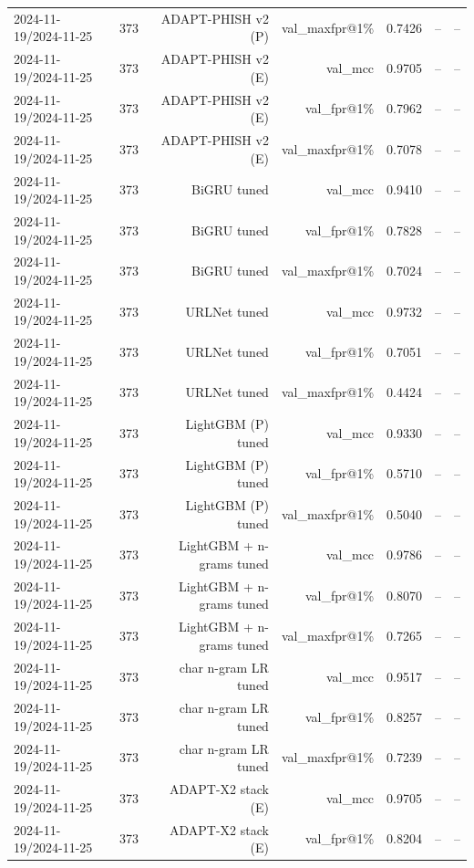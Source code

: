 \begin{table}[t]
\begin{tabular}{llrrrrr}
2024-11-19/2024-11-25 & 373 & ADAPT-PHISH v2 (P) & val\_maxfpr@1\% & 0.7426 & -- & -- \\
2024-11-19/2024-11-25 & 373 & ADAPT-PHISH v2 (E) & val\_mcc & 0.9705 & -- & -- \\
2024-11-19/2024-11-25 & 373 & ADAPT-PHISH v2 (E) & val\_fpr@1\% & 0.7962 & -- & -- \\
2024-11-19/2024-11-25 & 373 & ADAPT-PHISH v2 (E) & val\_maxfpr@1\% & 0.7078 & -- & -- \\
2024-11-19/2024-11-25 & 373 & BiGRU tuned & val\_mcc & 0.9410 & -- & -- \\
2024-11-19/2024-11-25 & 373 & BiGRU tuned & val\_fpr@1\% & 0.7828 & -- & -- \\
2024-11-19/2024-11-25 & 373 & BiGRU tuned & val\_maxfpr@1\% & 0.7024 & -- & -- \\
2024-11-19/2024-11-25 & 373 & URLNet tuned & val\_mcc & 0.9732 & -- & -- \\
2024-11-19/2024-11-25 & 373 & URLNet tuned & val\_fpr@1\% & 0.7051 & -- & -- \\
2024-11-19/2024-11-25 & 373 & URLNet tuned & val\_maxfpr@1\% & 0.4424 & -- & -- \\
2024-11-19/2024-11-25 & 373 & LightGBM (P) tuned & val\_mcc & 0.9330 & -- & -- \\
2024-11-19/2024-11-25 & 373 & LightGBM (P) tuned & val\_fpr@1\% & 0.5710 & -- & -- \\
2024-11-19/2024-11-25 & 373 & LightGBM (P) tuned & val\_maxfpr@1\% & 0.5040 & -- & -- \\
2024-11-19/2024-11-25 & 373 & LightGBM + n-grams tuned & val\_mcc & 0.9786 & -- & -- \\
2024-11-19/2024-11-25 & 373 & LightGBM + n-grams tuned & val\_fpr@1\% & 0.8070 & -- & -- \\
2024-11-19/2024-11-25 & 373 & LightGBM + n-grams tuned & val\_maxfpr@1\% & 0.7265 & -- & -- \\
2024-11-19/2024-11-25 & 373 & char n-gram LR tuned & val\_mcc & 0.9517 & -- & -- \\
2024-11-19/2024-11-25 & 373 & char n-gram LR tuned & val\_fpr@1\% & 0.8257 & -- & -- \\
2024-11-19/2024-11-25 & 373 & char n-gram LR tuned & val\_maxfpr@1\% & 0.7239 & -- & -- \\
2024-11-19/2024-11-25 & 373 & ADAPT-X2 stack (E) & val\_mcc & 0.9705 & -- & -- \\
2024-11-19/2024-11-25 & 373 & ADAPT-X2 stack (E) & val\_fpr@1\% & 0.8204 & -- & -- \\

\end{tabular}
\end{table}
